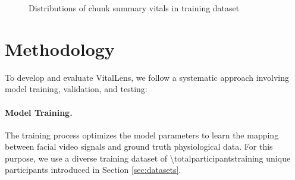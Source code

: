 \documentclass{article}
\begin{document}
\begin{figure}[h!]
    \centering
    \begin{subfigure}{0.48\textwidth}
    	\centering
    \end{subfigure}
    \hfill
    \begin{subfigure}{0.48\textwidth}
    	\centering
    \end{subfigure}
    \caption{Distributions of chunk summary vitals in training dataset}
    \label{fig:training-vitals-histogram}
\end{figure}

\section{Methodology}
\label{sec:methodology}

To develop and evaluate VitalLens, we follow a systematic approach involving model training, validation, and testing:

\paragraph{Model Training.}
The training process optimizes the model parameters to learn the mapping between facial video signals and ground truth physiological data.
For this purpose, we use a diverse training dataset of \num{\totalparticipantstraining} unique participants introduced in Section \ref{sec:datasets}.
\end{document}
